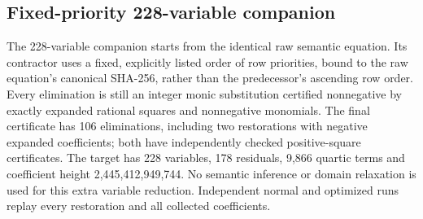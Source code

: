 \subsection{Fixed-priority 228-variable companion}



The 228-variable companion starts from the identical raw semantic equation. Its contractor uses a fixed, explicitly listed order of row priorities, bound to the raw equation's canonical SHA-256, rather than the predecessor's ascending row order. Every elimination is still an integer monic substitution certified nonnegative by exactly expanded rational squares and nonnegative monomials. The final certificate has 106 eliminations, including two restorations with negative expanded coefficients; both have independently checked positive-square certificates. The target has 228 variables, 178 residuals, 9,866 quartic terms and coefficient height 2,445,412,949,744. No semantic inference or domain relaxation is used for this extra variable reduction. Independent normal and optimized runs replay every restoration and all collected coefficients.
